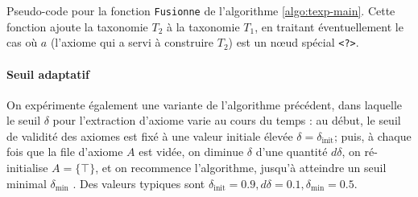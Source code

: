 \begin{algorithm}
\caption{Pseudo-code pour la fonction \texttt{Fusionne} de l'algorithme \ref{algo:texp-main}. Cette fonction ajoute la taxonomie $T_2$ à la taxonomie $T_1$, en traitant éventuellement le cas où $a$ (l'axiome qui a servi à construire $T_2$) est un nœud spécial \texttt{<?>}.}
\label{algo:texp-fusionne}
\end{algorithm}






\paragraph{Seuil adaptatif} On expérimente également une variante de l'algorithme précédent, dans laquelle le seuil $\delta$ pour l'extraction d'axiome varie au cours du temps : au début, le seuil de validité des axiomes est fixé à une valeur initiale élevée $\delta = \delta_\text{init}$; puis, à chaque fois que la file d'axiome $A$ est vidée, on diminue $\delta$ d'une quantité $d\delta$, on ré-initialise $A = \{ \top \}$, et on recommence l'algorithme, jusqu'à atteindre un seuil minimal $\delta_\text{min}$ . Des valeurs typiques sont $\delta_\text{init} = 0.9, d\delta = 0.1, \delta_\text{min} = 0.5$.

